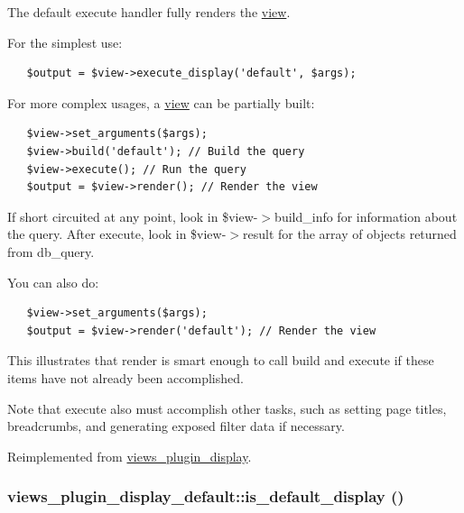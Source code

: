 The default execute handler fully renders the \hyperlink{classview}{view}.

For the simplest use: 

\begin{Code}\begin{verbatim}   $output = $view->execute_display('default', $args);
\end{verbatim}
\end{Code}



For more complex usages, a \hyperlink{classview}{view} can be partially built: 

\begin{Code}\begin{verbatim}   $view->set_arguments($args);
   $view->build('default'); // Build the query
   $view->execute(); // Run the query
   $output = $view->render(); // Render the view
\end{verbatim}
\end{Code}



If short circuited at any point, look in \$view-$>$build\_\-info for information about the query. After execute, look in \$view-$>$result for the array of objects returned from db\_\-query.

You can also do: 

\begin{Code}\begin{verbatim}   $view->set_arguments($args);
   $output = $view->render('default'); // Render the view
\end{verbatim}
\end{Code}



This illustrates that render is smart enough to call build and execute if these items have not already been accomplished.

Note that execute also must accomplish other tasks, such as setting page titles, breadcrumbs, and generating exposed filter data if necessary. 

Reimplemented from \hyperlink{classviews__plugin__display_f99c4a303d3e409ab7b14c6cfcd3a1d8}{views\_\-plugin\_\-display}.\hypertarget{classviews__plugin__display__default_721b29f71ff0536dfcf28831e4b96e72}{
\subsubsection[{is\_\-default\_\-display}]{\setlength{\rightskip}{0pt plus 5cm}views\_\-plugin\_\-display\_\-default::is\_\-default\_\-display ()}}
\label{classviews__plugin__display__default_721b29f71ff0536dfcf28831e4b96e72}


